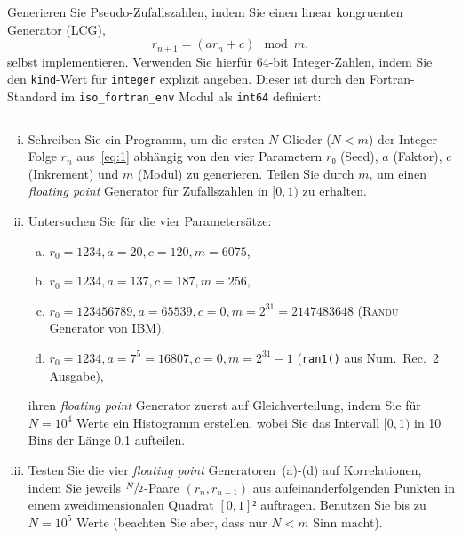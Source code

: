 
\NewDocumentCommand{}
\date{Ausgabe: Di, 16.04.2019, Besprechung: Fr, 26.04.2019}
\setcounter{question}{2}


\maketitle

\begin{question}[subtitle=Linear kongruente Generatoren]
  Generieren Sie Pseudo-Zufallszahlen, indem Sie einen linear kongruenten Generator (LCG),
  \begin{equation}
    \label{eq:1}
    r_{n + 1} = \left( a r_n + c \right) \mod m,
  \end{equation}
  selbst implementieren.
  Verwenden Sie hierfür \num{64}-bit Integer-Zahlen, indem Sie den \texttt{kind}-Wert für \texttt{integer} explizit angeben.
  Dieser ist durch den Fortran-Standard im \texttt{iso\_fortran\_env} Modul als \texttt{int64} definiert:
  \inputminted{fortran}{../src/aufgabe03.f90}
  \begin{enumerate}[(i)]
  \item Schreiben Sie ein Programm, um die ersten $N$ Glieder ($N < m$) der Integer-Folge $r_n$ aus~\cref{eq:1} abhängig von den vier Parametern $r₀$ (Seed), $a$ (Faktor), $c$ (Inkrement) und $m$ (Modul) zu generieren.
    Teilen Sie durch $m$, um einen \textit{floating point} Generator für Zufallszahlen in $[0, 1)$ zu erhalten.
  \item Untersuchen Sie für die vier Parametersätze:
    \begin{enumerate}[(a)]
    \item\label{item:1} $r_0 = 1234, a = 20, c = 120, m = 6075$,
    \item\label{item:2} $r_0 = 1234, a = 137, c = 187, m = 256$,
    \item\label{item:3} $r_0 = 123456789, a = 65539, c = 0, m = 2^{31} = 2147483648$ (\textsc{Randu} Generator von IBM),
    \item\label{item:4} $r_0 = 1234, a = 7^5 = 16807, c = 0, m = 2^{31} - 1$ (\texttt{ran1()} aus Num.\ Rec.\ 2 Ausgabe),
    \end{enumerate}
    ihren \textit{floating point} Generator zuerst auf Gleichverteilung, indem Sie für $N = 10^4$ Werte ein Histogramm erstellen, wobei Sie das Intervall $[0, 1)$ in \num{10} Bins der Länge \num{0.1} aufteilen.
  \item Testen Sie die vier \textit{floating point} Generatoren~(a)-(d) auf Korrelationen, indem Sie jeweils $\sfrac{N}{2}$-Paare $(r_n, r_{n - 1})$ aus aufeinanderfolgenden Punkten in einem zweidimensionalen Quadrat $[0, 1]²$ auftragen.
    Benutzen Sie bis zu $N = 10^5$ Werte (beachten Sie aber, dass nur $N < m$ Sinn macht).
  \end{enumerate}
\end{question}

